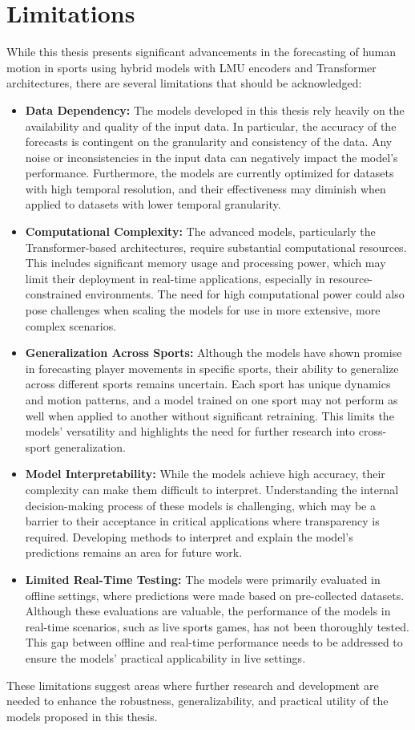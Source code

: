 \chapter{Limitations}

While this thesis presents significant advancements in the forecasting of human motion in sports using hybrid models with LMU encoders and Transformer architectures, there are several limitations that should be acknowledged:

\begin{itemize}
    \item \textbf{Data Dependency:} The models developed in this thesis rely heavily on the availability and quality of the input data. In particular, the accuracy of the forecasts is contingent on the granularity and consistency of the data. Any noise or inconsistencies in the input data can negatively impact the model's performance. Furthermore, the models are currently optimized for datasets with high temporal resolution, and their effectiveness may diminish when applied to datasets with lower temporal granularity.

    \item \textbf{Computational Complexity:} The advanced models, particularly the Transformer-based architectures, require substantial computational resources. This includes significant memory usage and processing power, which may limit their deployment in real-time applications, especially in resource-constrained environments. The need for high computational power could also pose challenges when scaling the models for use in more extensive, more complex scenarios.

    \item \textbf{Generalization Across Sports:} Although the models have shown promise in forecasting player movements in specific sports, their ability to generalize across different sports remains uncertain. Each sport has unique dynamics and motion patterns, and a model trained on one sport may not perform as well when applied to another without significant retraining. This limits the models' versatility and highlights the need for further research into cross-sport generalization.

    \item \textbf{Model Interpretability:} While the models achieve high accuracy, their complexity can make them difficult to interpret. Understanding the internal decision-making process of these models is challenging, which may be a barrier to their acceptance in critical applications where transparency is required. Developing methods to interpret and explain the model's predictions remains an area for future work.

    \item \textbf{Limited Real-Time Testing:} The models were primarily evaluated in offline settings, where predictions were made based on pre-collected datasets. Although these evaluations are valuable, the performance of the models in real-time scenarios, such as live sports games, has not been thoroughly tested. This gap between offline and real-time performance needs to be addressed to ensure the models' practical applicability in live settings.
\end{itemize}

These limitations suggest areas where further research and development are needed to enhance the robustness, generalizability, and practical utility of the models proposed in this thesis.
